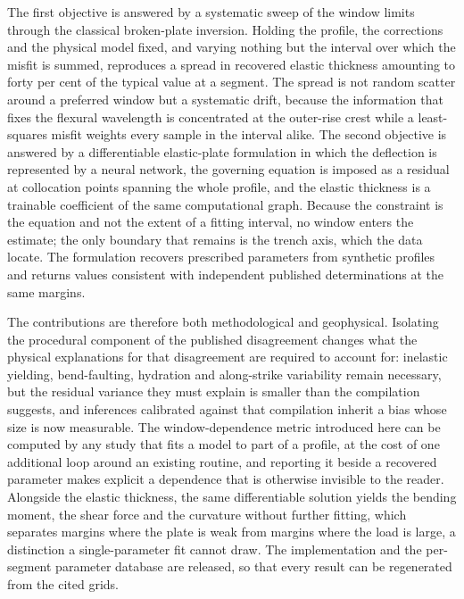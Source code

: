 \documentclass[final]{agujournal2019}
\begin{document}
The first objective is answered by a systematic sweep of the window limits
through the classical broken-plate inversion. Holding the profile, the
corrections and the physical model fixed, and varying nothing but the interval
over which the misfit is summed, reproduces a spread in recovered elastic
thickness amounting to forty per cent of the typical value at a segment. The spread is
not random scatter around a preferred window but a systematic drift, because the
information that fixes the flexural wavelength is concentrated at the outer-rise
crest while a least-squares misfit weights every sample in the interval alike.
The second objective is answered by a differentiable elastic-plate formulation
in which the deflection is represented by a neural network, the governing
equation is imposed as a residual at collocation points spanning the whole
profile, and the elastic thickness is a trainable coefficient of the same
computational graph. Because the constraint is the equation and not the extent
of a fitting interval, no window enters the estimate; the only boundary that
remains is the trench axis, which the data locate. The formulation recovers
prescribed parameters from synthetic profiles and returns values consistent with
independent published determinations at the same margins.

The contributions are therefore both methodological and geophysical. Isolating
the procedural component of the published disagreement changes what the physical
explanations for that disagreement are required to account for: inelastic
yielding, bend-faulting, hydration and along-strike variability remain necessary,
but the residual variance they must explain is smaller than the compilation
suggests, and inferences calibrated against that compilation inherit a bias whose
size is now measurable. The window-dependence metric introduced here can be
computed by any study that fits a model to part of a profile, at the cost of one
additional loop around an existing routine, and reporting it beside a recovered
parameter makes explicit a dependence that is otherwise invisible to the reader.
Alongside the elastic thickness, the same differentiable solution yields the
bending moment, the shear force and the curvature without further fitting, which
separates margins where the plate is weak from margins where the load is large,
a distinction a single-parameter fit cannot draw. The implementation and the
per-segment parameter database are released, so that every result can be
regenerated from the cited grids.
\end{document}
